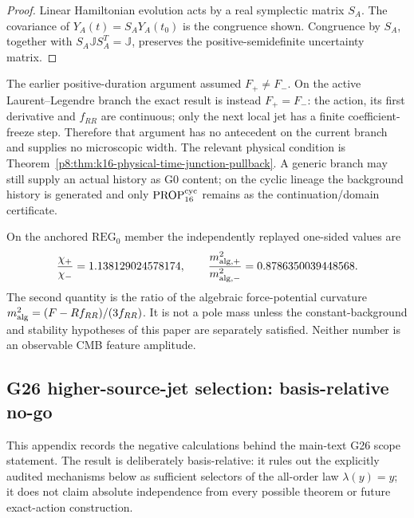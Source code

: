 \documentclass[12pt,a4paper]{article}
\begin{document}
\begin{proof}
Linear Hamiltonian evolution acts by a real symplectic matrix \(S_A\).  The
covariance of \(Y_A(t)=S_AY_A(t_0)\) is the congruence shown.  Congruence by
\(S_A\), together with \(S_A\mathbb J S_A^T=\mathbb J\), preserves the
positive-semidefinite uncertainty matrix.
\end{proof}


\begin{remark}
\label{p8:thm:v189-finite-action-k16-width}
The earlier positive-duration argument assumed $F_+\ne F_-$.  On the active
Laurent--Legendre branch the exact result is instead
\(F_+=F_-\): the action, its first derivative and $f_{RR}$ are continuous; only the next local jet has a finite coefficient-freeze step.  Therefore that argument has no antecedent on
the current branch and supplies no microscopic width.  The relevant physical
condition is Theorem~\ref{p8:thm:k16-physical-time-junction-pullback}.  A
generic branch may still supply an actual history as G0 content; on the cyclic
lineage the background history is generated and only
\(\mathrm{PROP}^{\rm cyc}_{16}\) remains as the continuation/domain
certificate.
\end{remark}

\begin{remark}
\label{p8:rem:v189-k16-one-sided-diagnostics}
On the anchored $\mathrm{REG}_0$ member the independently replayed one-sided
values are
\[
 \frac{\chi_+}{\chi_-}=1.138129024578174,
 \qquad
 \frac{m_{{\rm alg},+}^2}{m_{{\rm alg},-}^2}
 =0.8786350039448568.
\]
The second quantity is the ratio of the algebraic force-potential curvature
$m_{\rm alg}^2=(F-Rf_{RR})/(3f_{RR})$.  It is not a pole mass unless the
constant-background and stability hypotheses of this paper are separately
satisfied.  Neither number is an observable CMB feature amplitude.
\end{remark}

\subsection{G26 higher-source-jet selection: basis-relative no-go}
\label{p8:app:v260-g26-higher-jet-nogo}
This appendix records the negative calculations behind the main-text G26
scope statement.  The result is deliberately basis-relative: it rules out the
explicitly audited mechanisms below as sufficient selectors of the all-order
law \(\lambda(y)=y\); it does not claim absolute independence from every
possible theorem or future exact-action construction.
\end{document}
